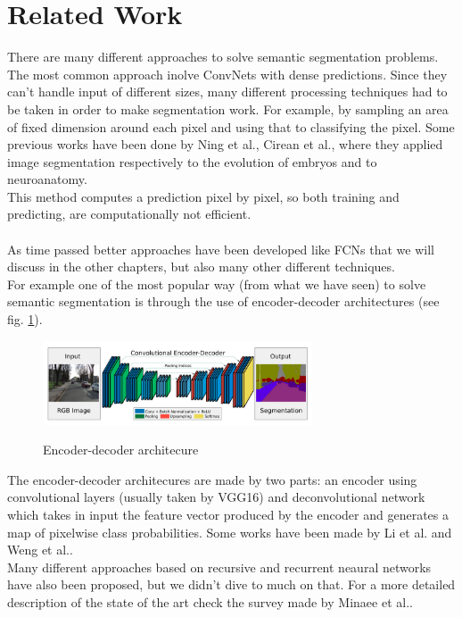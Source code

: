 \documentclass[10pt,twocolumn,letterpaper]{article}
\begin{document}
\section{Related Work}

There are many different approaches to solve semantic segmentation problems. The most common approach inolve ConvNets with dense predictions. Since they can't handle input of different sizes, many different processing techniques had to be taken in order to make segmentation work. For example, by sampling an area of fixed dimension around each pixel and  using that to classifying the pixel. Some previous works have been done by Ning et al.\cite{1495508}, Cirean et al.\cite{article}, where they applied image segmentation respectively to the evolution of embryos and to neuroanatomy. \\
This method computes a prediction pixel by pixel, so both training and predicting, are computationally not efficient. \\ \\
As time passed better approaches have been developed like FCNs that we will discuss in the other chapters, but also many other different techniques.\\
For example one of the most popular way (from what we have seen) to solve semantic segmentation is through the use of encoder-decoder architectures (see fig. \ref{ednet}).
\begin{figure}[t]
	\includegraphics[width=8cm]{image/ednet}
	\label{ednet}
	\centering
	\caption{Encoder-decoder architecure}
\end{figure}
The encoder-decoder architecures are made by two parts: an encoder using convolutional layers (usually taken by VGG16) and deconvolutional network which takes in input the feature vector produced by the encoder and generates a map of pixelwise class probabilities. Some works have been made by Li et al.\cite{8379359} and Weng et al.\cite{8681706}.\\
Many different approaches based on recursive and recurrent neaural networks have also been proposed, but we didn't dive to much on that. For a more detailed description of the state of the art check the survey made by Minaee et al.\cite{unknown}. 
\end{document}
